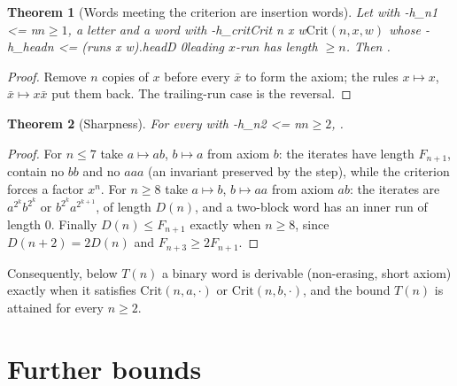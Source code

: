 \documentclass[11pt]{article}
\newtheorem{theorem}{Theorem}
\theoremstyle{definition}
\theoremstyle{remark}
\begin{document}
\begin{theorem}[Words meeting the criterion are insertion words]
Let  with \hyp{h_n}{1 <= n}{$n\ge1$},  a letter and
 a word with \hyp{h_crit}{Crit n x w}{$\mathrm{Crit}(n,x,w)$} whose
\hyp{h_head}{n <= (runs x w).headD 0}{leading $x$-run has length $\ge n$}. Then
.
\end{theorem}
\begin{proof}
Remove $n$ copies of $x$ before every $\bar x$ to form the axiom; the rules $x\mapsto x$,
$\bar x\mapsto x\bar x$ put them back. The trailing-run case is the reversal.
\end{proof}

\begin{theorem}[Sharpness]
For every  with \hyp{h_n}{2 <= n}{$n\ge2$},
.
\end{theorem}
\begin{proof}
For $n\le7$ take $a\mapsto ab$, $b\mapsto a$ from axiom $b$: the iterates have length $F_{n+1}$,
contain no $bb$ and no $aaa$ (an invariant preserved by the step), while the criterion forces a
factor $x^n$. For $n\ge8$ take $a\mapsto b$, $b\mapsto aa$ from axiom $ab$: the iterates are
$a^{2^k}b^{2^k}$ or $b^{2^k}a^{2^{k+1}}$, of length $D(n)$, and a two-block word has an inner run
of length $0$. Finally $D(n)\le F_{n+1}$ exactly when $n\ge8$, since $D(n+2)=2D(n)$ and
$F_{n+3}\ge2F_{n+1}$.
\end{proof}

Consequently, below $T(n)$ a binary word is derivable (non-erasing, short axiom) exactly when
it satisfies $\mathrm{Crit}(n,a,\cdot)$ or $\mathrm{Crit}(n,b,\cdot)$, and the bound $T(n)$ is
attained for every $n\ge2$.

\section{Further bounds}
\end{document}
